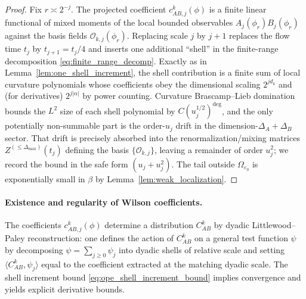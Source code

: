 \begin{proof}

Fix $r\asymp 2^{-j}$. The projected coefficient $c_{AB,j}^k(\phi)$ is a finite linear functional of mixed moments of
the local bounded observables $A_j(\phi_r)B_j(\phi_r)$ against the basis fields $\mathcal O_{k,j}(\phi_r)$.
Replacing scale $j$ by $j+1$ replaces the flow time $t_j$ by $t_{j+1}=t_j/4$ and inserts one additional ``shell''
in the finite-range decomposition \eqref{eq:finite_range_decomp}.
Exactly as in Lemma~\ref{lem:one_shell_increment}, the shell contribution is a finite sum of local curvature polynomials whose coefficients
obey the dimensional scaling $2^{jd_k}$ and (for derivatives) $2^{j|\alpha|}$ by power counting.
Curvature Brascamp--Lieb domination bounds the $L^2$ size of each shell polynomial by $C(u_j^{1/2})^{\deg}$, and the only potentially
non-summable part is the order-$u_j$ drift in the dimension-$\Delta_A+\Delta_B$ sector.
That drift is precisely absorbed into the renormalization/mixing matrices $Z^{(\le\Delta_{\max})}(t_j)$ defining the basis
$\{\mathcal O_{k,j}\}$, leaving a remainder of order $u_j^2$; we record the bound in the safe form $(u_j+u_j^2)$.
The tail outside $\Omega_{\varepsilon_0}$ is exponentially small in $\beta$ by Lemma~\ref{lem:weak_localization}.
\end{proof}

\paragraph{Existence and regularity of Wilson coefficients.}
The coefficients $c_{AB,j}^k(\phi)$ determine a distribution $C_{AB}^k$ by dyadic Littlewood--Paley reconstruction:
one defines the action of $C_{AB}^k$ on a general test function $\psi$ by decomposing $\psi=\sum_{j\ge 0}\psi_j$ into dyadic shells
of relative scale and setting $\langle C_{AB}^k,\psi_j\rangle$ equal to the coefficient extracted at the matching dyadic scale.
The shell increment bound \eqref{eq:ope_shell_increment_bound} implies convergence and yields explicit derivative bounds.

